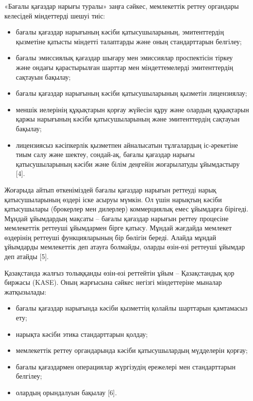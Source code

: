 \begin{multicols}{2}
«Бағалы қағаздар нарығы туралы» заңға сәйкес, мемлекеттік реттеу
органдары келесідей міндеттерді шешуі тиіс:

\begin{itemize}
\item
  бағалы қағаздар нарығының кәсіби қатысушыларының, эмитенттердің
  қызметіне қатысты міндетті талаптарды және оның стандарттарын
  белгілеу;
\item
  бағалы эмиссиялық қағаздар шығару мен эмиссиялар проспектісін тіркеу
  және ондағы қарастырылған шарттар мен міндеттемелерді эмитенттердің
  сақтауын бақылау;
\item
  бағалы қағаздар нарығының кәсіби қатысушыларының қызметін лицензиялау;
\item
  меншік иелерінің құқықтарын қорғау жүйесін құру және олардың
  құқықтарын қаржы нарығының кәсіби қатысушыларының және эмитенттердің
  сақтауын бақылау;
\item
  лицензиясыз кәсіпкерлік қызметпен айналысатын тұлғалардың іс-әрекетіне
  тиым салу және шектеу, сондай-ақ, бағалы қағаздар нарығы
  қатысушыларының кәсіби және білім деңгейін жоғарылатуды ұйымдастыру
  {[}4{]}.
\end{itemize}

Жоғарыда айтып өткеніміздей бағалы қағаздар нарығын реттеуді нарық
қатысушыларының өздері іске асыруы мүмкін. Ол үшін нарықтың кәсіби
қатысушылары (брокерлер мен дилерлер) коммерциялық емес ұйымдарға
бірігеді. Мұндай ұйымдардың мақсаты -- бағалы қағаздар нарығын реттеу
процесіне мемлекеттік реттеуші ұйымдармен бірге қатысу. Мұндай жағдайда
мемлекет өздерінің реттеуші функцияларының бір бөлігін береді. Алайда
мұндай ұйымдарды мемлекеттік деп атауға болмайды, оларды өзін-өзі
реттеуші ұйымдар деп атайды {[}5{]}.

Қазақстанда жалғыз толыққанды өзін-өзі реттейтін ұйым -- Қазақстандық
қор биржасы (KASE). Оның жарғысына сәйкес негізгі міндеттеріне мыналар
жатқызылады:

\begin{itemize}
\item
  бағалы қағаздар нарығында кәсіби қызметтің қолайлы шарттарын
  қамтамасыз ету;
\item
  нарықта кәсіби этика стандарттарын қолдау;
\item
  мемлекеттік реттеу органдарында кәсіби қатысушылардың мүдделерін
  қорғау;
\item
  бағалы қағаздармен операциялар жүргізудің ережелері мен стандарттарын
  белгілеу;
\item
  олардың орындалуын бақылау {[}6{]}.
\end{itemize}


\end{multicols}
